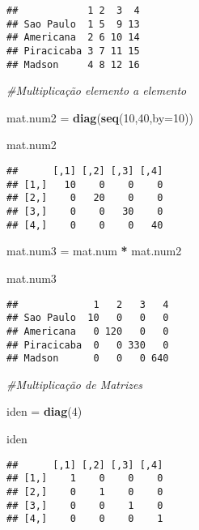 \documentclass[]{article}
\newenvironment{Shaded}{\begin{snugshade}}{\end{snugshade}}
\newcommand{\KeywordTok}[1]{\textcolor[rgb]{0.13,0.29,0.53}{\textbf{#1}}}
\newcommand{\DataTypeTok}[1]{\textcolor[rgb]{0.13,0.29,0.53}{#1}}
\newcommand{\DecValTok}[1]{\textcolor[rgb]{0.00,0.00,0.81}{#1}}
\newcommand{\StringTok}[1]{\textcolor[rgb]{0.31,0.60,0.02}{#1}}
\newcommand{\CommentTok}[1]{\textcolor[rgb]{0.56,0.35,0.01}{\textit{#1}}}
\newcommand{\OperatorTok}[1]{\textcolor[rgb]{0.81,0.36,0.00}{\textbf{#1}}}
\newcommand{\NormalTok}[1]{#1}
\begin{document}
\begin{verbatim}
##            1 2  3  4
## Sao Paulo  1 5  9 13
## Americana  2 6 10 14
## Piracicaba 3 7 11 15
## Madson     4 8 12 16
\end{verbatim}

\begin{Shaded}
\begin{Highlighting}[]
\CommentTok{#Multiplicação elemento a elemento}

\NormalTok{mat.num2 =}\StringTok{ }\KeywordTok{diag}\NormalTok{(}\KeywordTok{seq}\NormalTok{(}\DecValTok{10}\NormalTok{,}\DecValTok{40}\NormalTok{,}\DataTypeTok{by=}\DecValTok{10}\NormalTok{))}

\NormalTok{mat.num2}
\end{Highlighting}
\end{Shaded}

\begin{verbatim}
##      [,1] [,2] [,3] [,4]
## [1,]   10    0    0    0
## [2,]    0   20    0    0
## [3,]    0    0   30    0
## [4,]    0    0    0   40
\end{verbatim}

\begin{Shaded}
\begin{Highlighting}[]
\NormalTok{mat.num3 =}\StringTok{ }\NormalTok{mat.num }\OperatorTok{*}\StringTok{ }\NormalTok{mat.num2}

\NormalTok{mat.num3}
\end{Highlighting}
\end{Shaded}

\begin{verbatim}
##             1   2   3   4
## Sao Paulo  10   0   0   0
## Americana   0 120   0   0
## Piracicaba  0   0 330   0
## Madson      0   0   0 640
\end{verbatim}

\begin{Shaded}
\begin{Highlighting}[]
\CommentTok{#Multiplicação de Matrizes}

\NormalTok{iden =}\StringTok{ }\KeywordTok{diag}\NormalTok{(}\DecValTok{4}\NormalTok{)}

\NormalTok{iden}
\end{Highlighting}
\end{Shaded}

\begin{verbatim}
##      [,1] [,2] [,3] [,4]
## [1,]    1    0    0    0
## [2,]    0    1    0    0
## [3,]    0    0    1    0
## [4,]    0    0    0    1
\end{verbatim}
\end{document}
